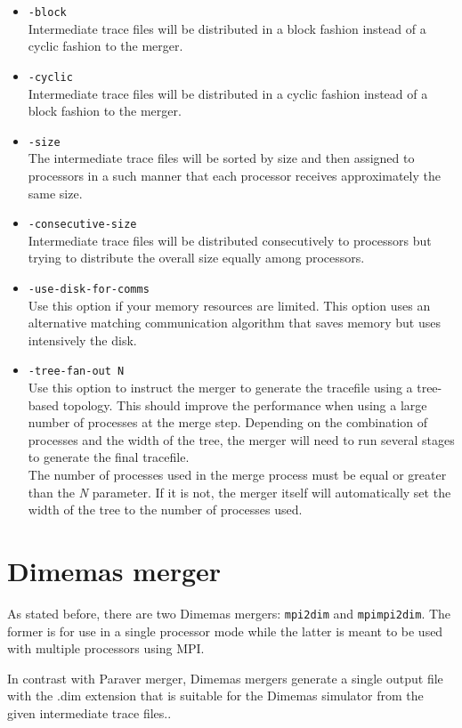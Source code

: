 \begin{itemize}
 \item {\tt -block}\\
  Intermediate trace files will be distributed in a block fashion instead of a cyclic fashion to the merger.
 \item {\tt -cyclic}\\
	Intermediate trace files will be distributed in a cyclic fashion instead of a block fashion to the merger.
 \item {\tt -size}\\
	The intermediate trace files will be sorted by size and then assigned to processors in a such manner that each processor receives approximately the same size.
 \item {\tt -consecutive-size}\\
	Intermediate trace files will be distributed consecutively to processors but trying to distribute the overall size equally among processors.
 \item {\tt -use-disk-for-comms}\\
 Use this option if your memory resources are limited. This option uses an alternative matching communication algorithm that saves memory but uses intensively the disk.
 \item{\tt -tree-fan-out N}\\
  Use this option to instruct the merger to generate the tracefile using a tree-based topology. This should improve the performance when using a large number of processes at the merge step. Depending on the combination of processes and the width of the tree, the merger will need to run several stages to generate the final tracefile.\\
  The number of processes used in the merge process must be equal or greater than the {\em N} parameter. If it is not, the merger itself will automatically set the width of the tree to the number of processes used.
\end{itemize}

\section{Dimemas merger}

As stated before, there are two Dimemas mergers: {\tt mpi2dim} and {\tt mpimpi2dim}. The former is for use in a single processor mode while the latter is meant to be used with multiple processors using MPI.

In contrast with Paraver merger, Dimemas mergers generate a single output file with the .dim extension that is suitable for the Dimemas simulator from the given intermediate trace files..

